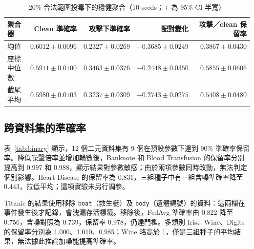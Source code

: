 \documentclass[12pt,a4paper]{article}
\begin{document}
\begin{table}[H]
\centering\small
\caption{20\% 合法範圍投毒下的穩健聚合（10 seeds；$\pm$ 為 95\% CI 半寬）}
\label{tab:robust}
\begin{tabular}{lrrrr}
\toprule
聚合器 & Clean 準確率 & 攻擊下準確率 & 配對變化 & 攻擊／clean 保留率 \\
\midrule
均值 & $0.6012\pm0.0096$ & $0.2327\pm0.0269$ & $-0.3685\pm0.0249$ & $0.3867\pm0.0430$ \\
座標中位數 & $0.5911\pm0.0100$ & $0.3463\pm0.0376$ & $-0.2448\pm0.0350$ & $0.5855\pm0.0606$ \\
截尾平均 & $0.5980\pm0.0103$ & $0.3237\pm0.0309$ & $-0.2743\pm0.0275$ & $0.5408\pm0.0480$ \\
\bottomrule
\end{tabular}
\end{table}

\subsection{跨資料集的準確率}
\label{sec:utility}
表~\ref{tab:binary} 顯示，12 個二元資料集有 9 個在預設參數下達到 90\% 準確率保留率。降低噪聲倍率並增加輪數後，Banknote 和 Blood Transfusion 的保留率分別提高到 0.997 和 0.988，顯示結果對參數敏感；由於兩項參數同時改動，無法判定個別影響。Heart Disease 的保留率為 0.831，三組種子中有一組含噪準確率降至 0.443，拉低平均；這項實驗未另行調參。

Titanic 的結果使用移除 \texttt{boat}（救生艇）及 \texttt{body}（遺體編號）的資料：這兩欄在事件發生後才記錄，會洩漏存活標籤。移除後，FedAvg 準確率由 0.822 降至 0.756，含噪對照為 0.739，保留率 0.978，仍達門檻。多類別 Iris、Wine、Digits 的保留率分別為 1.000、1.010、0.985；Wine 略高於 1，僅是三組種子的平均結果，無法據此推論加噪能提高準確率。
\end{document}
